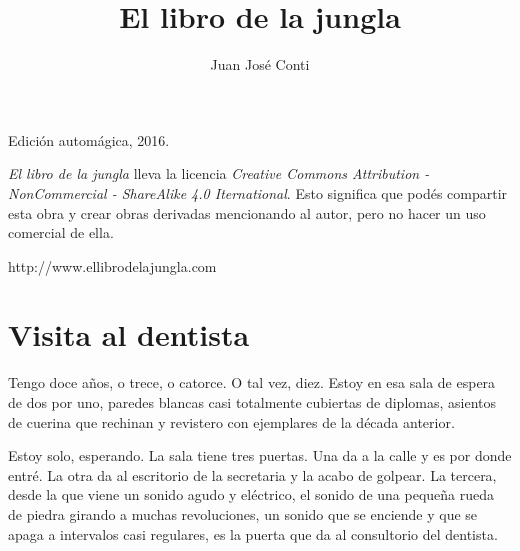 \documentclass[11pt,twoside,openright]{book}
\title{El libro de la jungla}
\author{Juan José Conti}
\date{}
\begin{document}

\pagestyle{plain}


%
%

\maketitle

\cleardoublepage

\thispagestyle{empty}
\noindent
Edición automágica, 2016.\\

\vspace{0.5cm}

\noindent
\emph{El libro de la jungla} lleva la licencia
\emph{Creative Commons Attribution - NonCommercial - ShareAlike 4.0 Iternational}.
Esto significa que podés compartir esta obra y crear obras derivadas
mencionando al autor, pero no ha\-cer un uso comercial de ella.

\vfill

\noindent
http://www.ellibrodelajungla.com\\

\cleardoublepage


\renewcommand*\contentsname{Índice}

\tableofcontents


\cleardoublepage




\chapter*{Visita al dentista}  
 Tengo doce años, o trece, o catorce. O tal vez, diez. Estoy en esa sala de
 espera de dos por uno, paredes blancas casi totalmente cubiertas de diplomas,
 asientos de cuerina que rechinan y revistero con ejemplares de la década
 anterior.
 
 Estoy solo, esperando. La sala tiene tres puertas. Una da a la calle y es por
 donde entré. La otra da al escritorio de la secretaria y la acabo de golpear.
 La tercera, desde la que viene un sonido agudo y eléctrico, el sonido de una
 pequeña rueda de piedra girando a muchas revoluciones, un sonido que se
 enciende y que se apaga a intervalos casi regulares, es la puerta que da al
 consultorio del dentista.
 
\end{document}
